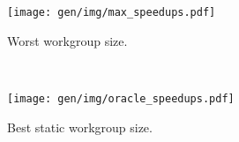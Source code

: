 \begin{subfigure}[h]{\textwidth}
\centering
\texttt{[image: gen/img/max\_speedups.pdf]}
\caption{%
  Worst workgroup size.%
}
\label{fig:oracle-speedups-worst}
\end{subfigure}
\\
\begin{subfigure}[h]{\textwidth}
\centering
\texttt{[image: gen/img/oracle\_speedups.pdf]}
\caption{%
  Best static workgroup size.%
}
\label{fig:oracle-speedups-baseline}
\end{subfigure}
